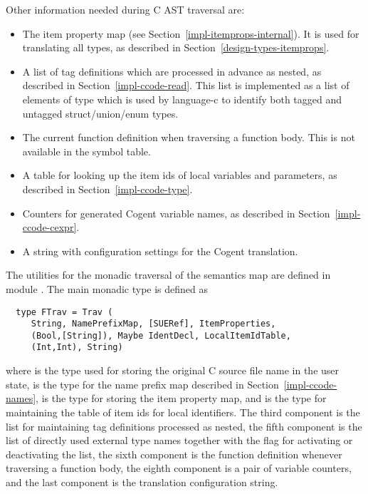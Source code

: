 Other information needed during C AST traversal are:
\begin{itemize}
\item The item property map (see Section~\ref{impl-itemprops-internal}).
It is used for translating all types, as described in Section~\ref{design-types-itemprops}.
\item A list of tag definitions which are processed in advance as nested, as described in 
Section~\ref{impl-ccode-read}. This list is implemented as a list of elements of type  which is used
by language-c to identify both tagged and untagged struct/union/enum types.
\item The current function definition when traversing a function body. This is not available in the symbol table.
\item A table for looking up the item ids of local variables and parameters, as described in Section~\ref{impl-ccode-type}.
\item Counters for generated Cogent variable names, as described in Section~\ref{impl-ccode-cexpr}.
\item A string with configuration settings for the Cogent translation.
\end{itemize}

The utilities for the monadic traversal of the semantics map are defined in module . 
The main monadic type is defined as
\begin{verbatim}
  type FTrav = Trav (
     String, NamePrefixMap, [SUERef], ItemProperties,
     (Bool,[String]), Maybe IdentDecl, LocalItemIdTable,
     (Int,Int), String)
\end{verbatim}
where  is the type used for storing the original C source file name in the user state,
 is the type for the name prefix map described in Section~\ref{impl-ccode-names},
 is the type for storing the item property map, and  is
the type for maintaining the table of item ids for local identifiers. The third component is the list for
maintaining tag definitions processed as nested, the fifth component is the list of directly used external type names 
together with the flag for activating or deactivating the list, the sixth component is the function definition
whenever traversing a function body, the eighth component is a pair of variable counters, and the last component
is the translation configuration string.

